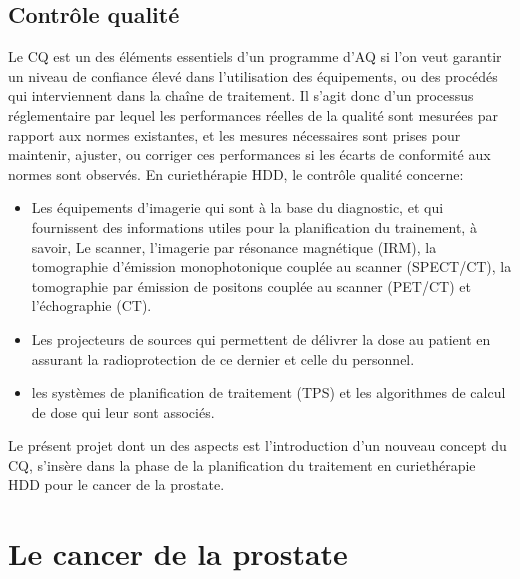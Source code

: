 \subsection{Contrôle qualité}
Le  CQ est un des éléments essentiels d’un programme d’AQ si l’on veut garantir un niveau de confiance élevé dans l’utilisation des équipements, ou des procédés qui interviennent dans la chaîne de traitement. Il s’agit donc d’un processus réglementaire par lequel les performances réelles de la qualité sont mesurées par rapport aux normes existantes, et les mesures nécessaires sont prises pour maintenir, ajuster, ou corriger ces performances si les écarts de conformité aux normes sont observés.\newline 
En curiethérapie HDD, le contrôle qualité concerne:
%
\begin{itemize}[label=\textbullet, font=\LARGE]
\item Les équipements d'imagerie qui sont à la base du diagnostic, et qui fournissent des informations utiles pour la planification du trainement, à savoir, Le scanner, l’imagerie par résonance magnétique (IRM),  la tomographie d’émission monophotonique couplée au scanner (SPECT/CT),  la tomographie par émission de positons couplée au scanner (PET/CT)  et l’échographie (CT). 
%
\item Les projecteurs de sources qui permettent de délivrer la dose au patient en assurant la radioprotection de ce dernier et celle du personnel.
%
\item les systèmes de planification de traitement (TPS) et les algorithmes de calcul de dose qui leur sont associés.
\end{itemize}
%
Le présent projet dont un des aspects est l’introduction d’un nouveau concept du CQ, s’insère dans la phase de la planification du traitement en curiethérapie HDD pour le cancer de la prostate.
%
\section{Le cancer de la prostate}     %
